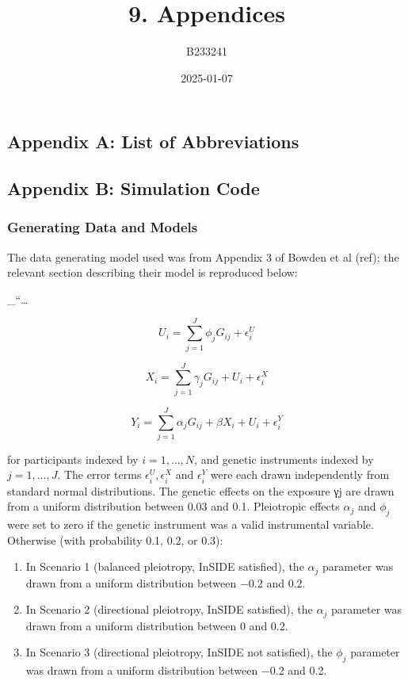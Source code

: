 \documentclass[
]{article}
\title{9. Appendices}
\author{B233241}
\date{2025-01-07}
\begin{document}
\maketitle

\subsection{Appendix A: List of
Abbreviations}\label{appendix-a-list-of-abbreviations}

\subsection{Appendix B: Simulation
Code}\label{appendix-b-simulation-code}

\subsubsection{Generating Data and
Models}\label{generating-data-and-models}

The data generating model used was from Appendix 3 of Bowden et al
(ref); the relevant section describing their model is reproduced below:

\_``\ldots{}

\begin{equation} 
U_i = \sum^J_{j=1} \phi_jG_{ij} + \epsilon_i^U
\end{equation}

\begin{equation} 
X_i = \sum^J_{j=1} \gamma_jG_{ij} + U_i + \epsilon_i^X
\end{equation}

\begin{equation} 
Y_i = \sum^J_{j=1} \alpha_jG_{ij} + \beta X_i + U_i + \epsilon_i^Y
\end{equation}

for participants indexed by \(i = 1, . . . , N\), and genetic
instruments indexed by \(j = 1, . . . , J\). The error terms
\(\epsilon_i^U , \epsilon_i^X\) and \(\epsilon_i^Y\) were each drawn
independently from standard normal distributions. The genetic effects on
the exposure γj are drawn from a uniform distribution between 0.03 and
0.1. Pleiotropic effects \(\alpha_j\) and \(\phi_j\) were set to zero if
the genetic instrument was a valid instrumental variable. Otherwise
(with probability 0.1, 0.2, or 0.3):

\begin{enumerate}
\def\labelenumi{\arabic{enumi}.}
\item
  In Scenario 1 (balanced pleiotropy, InSIDE satisfied), the
  \(\alpha_j\) parameter was drawn from a uniform distribution between
  −0.2 and 0.2.
\item
  In Scenario 2 (directional pleiotropy, InSIDE satisfied), the
  \(\alpha_j\) parameter was drawn from a uniform distribution between 0
  and 0.2.
\item
  In Scenario 3 (directional pleiotropy, InSIDE not satisfied), the
  \(\phi_j\) parameter was drawn from a uniform distribution between
  −0.2 and 0.2.
\end{enumerate}
\end{document}
